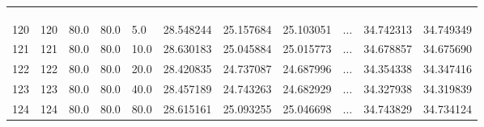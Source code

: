 \documentclass{beamer}
\begin{document}
\begin{frame}
\begin{table}[h]
{\begin{tabular}{ccp{0.8cm}p{0.8cm}p{0.8cm}p{1.6cm}p{1.6cm}p{1.6cm}p{0.3cm}p{1.6cm}p{1.6cm}}
				\bottomrule
				&&&&&&&&&&\\
				&&&&&&&\sbox0{\dots}\makebox[\wd0]{\vdots}&&&\\
				&&&&&&&&&&\\
				\toprule
				
				120 &       120 &  80.0 &  80.0 &   5.0 &      28.548244 &     25.157684 &     25.103051 &$\dots$&         34.742313 &         34.749349 \\
				121 &       121 &  80.0 &  80.0 &  10.0 &    28.630183 &     25.045884 &     25.015773 & $\dots$&        34.678857 &         34.675690 \\
				122 &       122 &  80.0 &  80.0 &  20.0 &  28.420835 &     24.737087 &     24.687996 & $\dots$&        34.354338 &         34.347416 \\
				123 &       123 &  80.0 &  80.0 &  40.0 &  28.457189 &     24.743263 &     24.682929 &$\dots$&         34.327938 &         34.319839 \\
				124 &       124 &  80.0 &  80.0 &  80.0 &    28.615161 &     25.093255 &     25.046698 & $\dots$&        34.743829 &         34.734124 \\
				\bottomrule[0.5mm]
		\end{tabular}}
	\end{table}
\end{frame}




\end{document}
